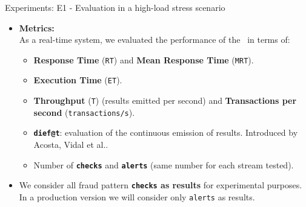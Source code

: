\begin{frame}{Experiments: E1 - Evaluation in a high-load stress scenario}
\begin{itemize}
\item \textbf{Metrics:\\}
    \vspace{0.5em}
    As a real-time system, we evaluated the performance of the \DPATM\ in terms of:
    \vspace{0.5em}
    \begin{itemize}
        \item \textbf{Response Time} (\texttt{RT}) and \textbf{Mean Response Time} (\texttt{MRT}).
        \vspace{0.5em}
        \item \textbf{Execution Time} (\texttt{ET}).
        \vspace{0.5em}
        \item \textbf{Throughput} (\texttt{T}) (results emitted per second) and \textbf{Transactions per second} (\texttt{transactions/s}).
        \vspace{0.5em}
        \item \textbf{\texttt{dief@t}}: evaluation of the continuous emission of results. Introduced by Acosta, Vidal et al.\cite{AcostaVidal2017}.
        \vspace{0.5em}
        \item Number of \textbf{\texttt{checks}} and \textbf{\texttt{alerts}} (same number for each stream tested).
    \end{itemize}
\vspace{0.5em}
\item We consider all fraud pattern \textbf{\texttt{checks} as results} for experimental purposes. In a production version we will consider only \texttt{alerts} as results.

\end{itemize}

\end{frame}



